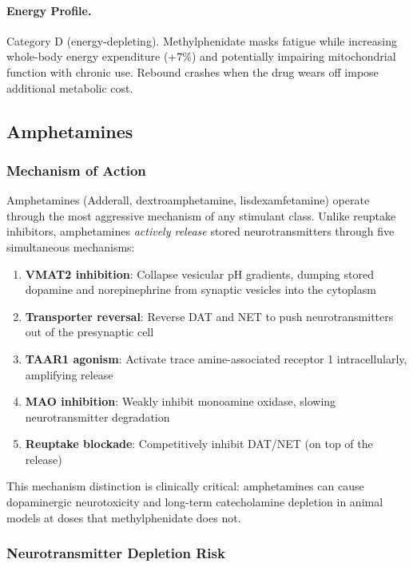 \paragraph{Energy Profile.}
Category D (energy-depleting). Methylphenidate masks fatigue while increasing whole-body energy expenditure (+7\%) and potentially impairing mitochondrial function with chronic use. Rebound crashes when the drug wears off impose additional metabolic cost.

\subsection{Amphetamines}
\label{subsec:amphetamines}

\subsubsection{Mechanism of Action}

Amphetamines (Adderall, dextroamphetamine, lisdexamfetamine) operate through the most aggressive mechanism of any stimulant class. Unlike reuptake inhibitors, amphetamines \textit{actively release} stored neurotransmitters through five simultaneous mechanisms:
\begin{enumerate}
    \item \textbf{VMAT2 inhibition}: Collapse vesicular pH gradients, dumping stored dopamine and norepinephrine from synaptic vesicles into the cytoplasm
    \item \textbf{Transporter reversal}: Reverse DAT and NET to push neurotransmitters out of the presynaptic cell
    \item \textbf{TAAR1 agonism}: Activate trace amine-associated receptor 1 intracellularly, amplifying release
    \item \textbf{MAO inhibition}: Weakly inhibit monoamine oxidase, slowing neurotransmitter degradation
    \item \textbf{Reuptake blockade}: Competitively inhibit DAT/NET (on top of the release)
\end{enumerate}

This mechanism distinction is clinically critical: amphetamines can cause dopaminergic neurotoxicity and long-term catecholamine depletion in animal models at doses that methylphenidate does not.

\subsubsection{Neurotransmitter Depletion Risk}

